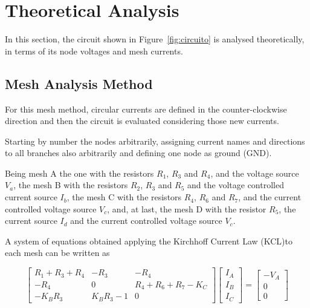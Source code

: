 \section{Theoretical Analysis}
\label{sec:analysis}

\hspace{0,5cm} In this section, the circuit shown in Figure~\ref{fig:circuito} is analysed theoretically, in terms of its node voltages and mesh currents.

\subsection{Mesh Analysis Method}

\hspace{0,5cm} 

For this mesh method, circular currents are defined in the counter-clockwise direction and then the circuit is evaluated considering those new currents.

Starting by number the nodes arbitrarily, assigning current names and directions to all branches also arbitrarily and defining one node as ground (GND). 

Being mesh A the one with the resistors $R_1$, $R_3$ and $R_4$, and the voltage source $V_a$, the mesh B with the resistors $R_2$, $R_3$ and $R_5$ and the voltage controlled current source $I_b$, the mesh C with the resistors $R_4$, $R_6$ and $R_7$, and the current controlled voltage source $V_c$, and, at last, the mesh D with the resistor $R_5$, the current source $I_d$ and the current controlled voltage source $V_c$. 

A system of equations obtained applying the Kirchhoff Current Law (KCL)to each mesh can be written as 

\begin{equation}
\begin{bmatrix} 
R_1 + R_3 + R_4 & -R_3 & -R_4 \\ 
-R_4 & 0 & R_4 + R_6 + R_7 - K_C\\
-K_B R_3 & K_B R_3 - 1 & 0
\end{bmatrix} 
\begin{bmatrix} 
I_A \\ 
I_B \\ 
I_C
\end{bmatrix} =
\begin{bmatrix} 
-V_A \\ 
0 \\ 
0
\end{bmatrix}
\end{equation}

